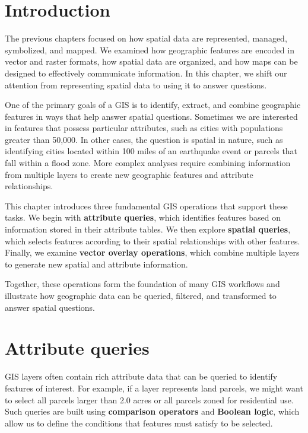 \documentclass[
  letterpaper,
]{book}
\begin{document}
\section{Introduction}\label{introduction-7}

The previous chapters focused on how spatial data are represented,
managed, symbolized, and mapped. We examined how geographic features are
encoded in vector and raster formats, how spatial data are organized,
and how maps can be designed to effectively communicate information. In
this chapter, we shift our attention from representing spatial data to
using it to answer questions.

One of the primary goals of a GIS is to identify, extract, and combine
geographic features in ways that help answer spatial questions.
Sometimes we are interested in features that possess particular
attributes, such as cities with populations greater than 50,000. In
other cases, the question is spatial in nature, such as identifying
cities located within 100 miles of an earthquake event or parcels that
fall within a flood zone. More complex analyses require combining
information from multiple layers to create new geographic features and
attribute relationships.

This chapter introduces three fundamental GIS operations that support
these tasks. We begin with \textbf{attribute queries}, which identifies
features based on information stored in their attribute tables. We then
explore \textbf{spatial queries}, which selects features according to
their spatial relationships with other features. Finally, we examine
\textbf{vector overlay operations}, which combine multiple layers to
generate new spatial and attribute information.

Together, these operations form the foundation of many GIS workflows and
illustrate how geographic data can be queried, filtered, and transformed
to answer spatial questions.

\section{Attribute queries}\label{attribute-queries}

GIS layers often contain rich attribute data that can be queried to
identify features of interest. For example, if a layer represents land
parcels, we might want to select all parcels larger than 2.0 acres or
all parcels zoned for residential use. Such queries are built using
\textbf{comparison operators} and \textbf{Boolean logic}, which allow us
to define the conditions that features must satisfy to be selected.
\end{document}
